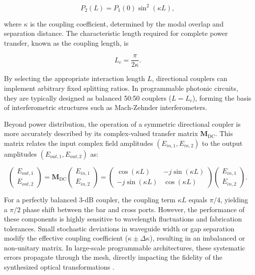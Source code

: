 \begin{equation}
P_2(L) = P_1(0)\sin^2(\kappa L),
\end{equation}

where $\kappa$ is the coupling coefficient, determined by the modal overlap and separation 
distance. The characteristic length required for complete power transfer, known as the coupling 
length, is

\begin{equation}
L_c = \frac{\pi}{2\kappa}.
\end{equation}

By selecting the appropriate interaction length $L$, directional couplers can implement arbitrary 
fixed splitting ratios. In programmable photonic circuits, they are typically designed as balanced 
50:50 couplers ($L = L_c$), forming the basis of interferometric structures such as Mach-Zehnder 
interferometers.

Beyond power distribution, the operation of a symmetric directional coupler is more accurately 
described by its complex-valued transfer matrix $\mathbf{M}_{\text{DC}}$. This matrix relates the 
input complex field amplitudes $(E_{in,1}, E_{in,2})$ to the output amplitudes 
$(E_{out,1}, E_{out,2})$ as:

\begin{equation}
\begin{pmatrix} E_{out,1} \\ E_{out,2} \end{pmatrix} = \mathbf{M}_{\text{DC}} \begin{pmatrix} 
    E_{in,1} \\ E_{in,2} \end{pmatrix} = \begin{pmatrix} \cos(\kappa L) & -j\sin(\kappa L) \\ 
        -j\sin(\kappa L) & \cos(\kappa L) \end{pmatrix} \begin{pmatrix} E_{in,1} \\ E_{in,2} 
        \end{pmatrix}.
\label{eq:matrix_dc}
\end{equation}


For a perfectly balanced 3-dB coupler, the coupling term $\kappa L$ equals $\pi/4$, yielding a 
$\pi/2$ phase shift between the bar and cross ports. However, the performance of these components 
is highly sensitive to wavelength fluctuations and fabrication tolerances. Small stochastic 
deviations in waveguide width or gap separation modify the effective coupling coefficient 
($\kappa \pm \Delta\kappa$), resulting in an imbalanced or non-unitary matrix. In large-scale 
programmable architectures, these systematic errors propagate through the mesh, directly 
impacting the fidelity of the synthesized optical transformations 
\cite{chrostowskiSiliconPhotonicsDesign2015}.


